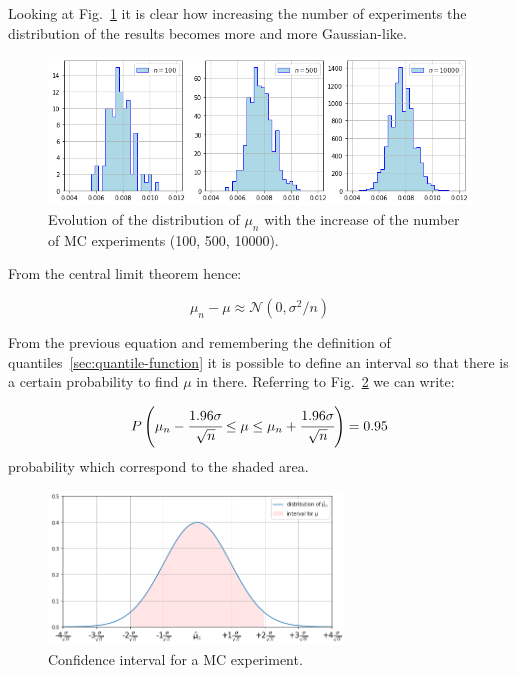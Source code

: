 Looking at Fig.~\ref{fig:repeated_MC} it is clear how increasing the number of
experiments the distribution of the results becomes more and more Gaussian-like.

\begin{figure}[htb]
	\centering
	\includegraphics[width=1\textwidth]{figures/central_limit}
	\caption{Evolution of the distribution of $\mu_n$ with the increase of
	the number of MC experiments (100, 500, 10000).}
\label{fig:repeated_MC}
\end{figure}

From the central limit theorem hence: 

\begin{equation}
\mu_n - \mu \approx \mathcal{N}(0, \sigma^2/n)
\end{equation}

From the previous equation and remembering the definition of quantiles~\ref{sec:quantile-function} it is possible to define an interval so that there is a certain probability to find $\mu$ in there. Referring to Fig.~\ref{fig:confidence_interval} we can write:

\begin{equation}
P\left(\mu_n - \cfrac{1.96\sigma}{\sqrt{n}}\le \mu \le \mu_n + \cfrac{1.96\sigma}{\sqrt{n}}\right) = 0.95
\end{equation}
probability which correspond to the shaded area.

\begin{figure}[htb]
	\centering
	\includegraphics[width=0.7\textwidth]{figures/confidence_interval.png}
	\caption{Confidence interval for a MC experiment.}
	\label{fig:confidence_interval}
\end{figure}

